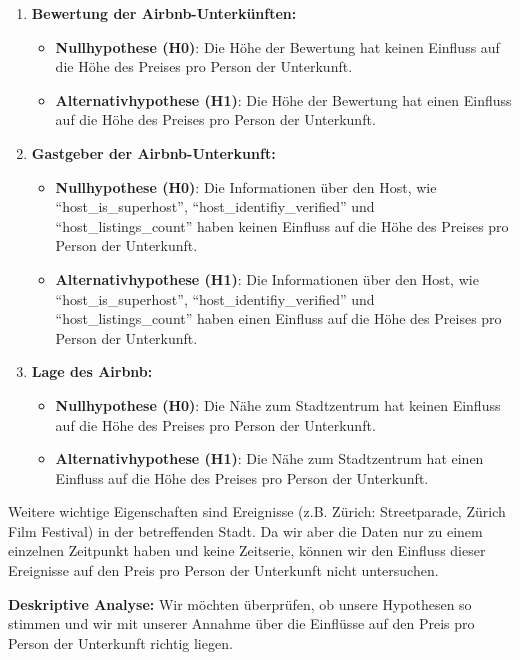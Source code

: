 \documentclass[
  journal,
]{IEEEtran}%
\begin{document}
\begin{enumerate}
\def\labelenumi{\arabic{enumi}.}
\item
  \textbf{Bewertung der Airbnb-Unterkünften:}

  \begin{itemize}
  \item
    \textbf{Nullhypothese (H0)}: Die Höhe der Bewertung hat keinen
    Einfluss auf die Höhe des Preises pro Person der Unterkunft.
  \item
    \textbf{Alternativhypothese (H1)}: Die Höhe der Bewertung hat einen
    Einfluss auf die Höhe des Preises pro Person der Unterkunft.
  \end{itemize}
\item
  \textbf{Gastgeber der Airbnb-Unterkunft:}

  \begin{itemize}
  \item
    \textbf{Nullhypothese (H0)}: Die Informationen über den Host, wie
    ``host\_is\_superhost'', ``host\_identifiy\_verified'' und
    ``host\_listings\_count'' haben keinen Einfluss auf die Höhe des
    Preises pro Person der Unterkunft.
  \item
    \textbf{Alternativhypothese (H1)}: Die Informationen über den Host,
    wie ``host\_is\_superhost'', ``host\_identifiy\_verified'' und
    ``host\_listings\_count'' haben einen Einfluss auf die Höhe des
    Preises pro Person der Unterkunft.
  \end{itemize}
\item
  \textbf{Lage des Airbnb:}

  \begin{itemize}
  \item
    \textbf{Nullhypothese (H0)}: Die Nähe zum Stadtzentrum hat keinen
    Einfluss auf die Höhe des Preises pro Person der Unterkunft.
  \item
    \textbf{Alternativhypothese (H1)}: Die Nähe zum Stadtzentrum hat
    einen Einfluss auf die Höhe des Preises pro Person der Unterkunft.
  \end{itemize}
\end{enumerate}

Weitere wichtige Eigenschaften sind Ereignisse (z.B. Zürich:
Streetparade, Zürich Film Festival) in der betreffenden Stadt. Da wir
aber die Daten nur zu einem einzelnen Zeitpunkt haben und keine
Zeitserie, können wir den Einfluss dieser Ereignisse auf den Preis pro
Person der Unterkunft nicht untersuchen.

\textbf{Deskriptive Analyse:} Wir möchten überprüfen, ob unsere
Hypothesen so stimmen und wir mit unserer Annahme über die Einflüsse auf
den Preis pro Person der Unterkunft richtig liegen.
\end{document}
